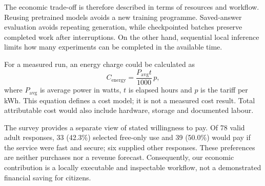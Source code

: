 The economic trade-off is therefore described in terms of resources and workflow. Reusing pretrained models avoids a new training programme. Saved-answer evaluation avoids repeating generation, while checkpointed batches preserve completed work after interruptions. On the other hand, sequential local inference limits how many experiments can be completed in the available time.

For a measured run, an energy charge could be calculated as
\begin{equation}
C_{\mathrm{energy}}=\frac{P_{\mathrm{avg}}t}{1000}\,p,
\end{equation}
where $P_{\mathrm{avg}}$ is average power in watts, $t$ is elapsed hours and $p$ is the tariff per kWh. This equation defines a cost model; it is not a measured cost result. Total attributable cost would also include hardware, storage and documented labour.

The survey provides a separate view of stated willingness to pay. Of 78 valid adult responses, 33 (42.3\%) selected free-only use and 39 (50.0\%) would pay if the service were fast and secure; six supplied other responses. These preferences are neither purchases nor a revenue forecast. Consequently, our economic contribution is a locally executable and inspectable workflow, not a demonstrated financial saving for citizens.
